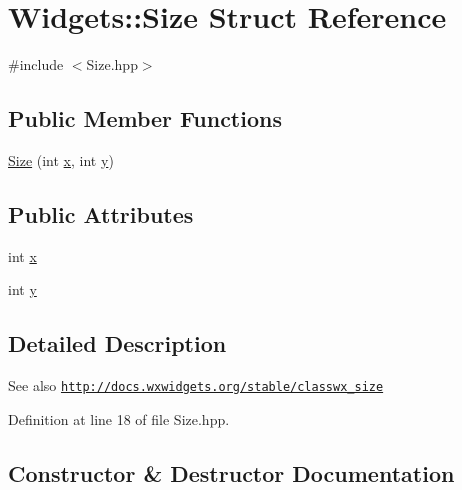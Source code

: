 \hypertarget{struct_widgets_1_1_size}{}\section{Widgets\+:\+:Size Struct Reference}
\label{struct_widgets_1_1_size}


{\ttfamily \#include $<$Size.\+hpp$>$}

\subsection*{Public Member Functions}
\begin{DoxyCompactItemize}
\item 
\hyperlink{struct_widgets_1_1_size_adbe84b848a3f80680f7b6e716691b83a}{Size} (int \hyperlink{struct_widgets_1_1_size_a49c5bc810ac1bc55c4466f94ca56fec0}{x}, int \hyperlink{struct_widgets_1_1_size_adf38e2f9f1cdf5b919a03004fe02c59d}{y})
\end{DoxyCompactItemize}
\subsection*{Public Attributes}
\begin{DoxyCompactItemize}
\item 
int \hyperlink{struct_widgets_1_1_size_a49c5bc810ac1bc55c4466f94ca56fec0}{x}
\item 
int \hyperlink{struct_widgets_1_1_size_adf38e2f9f1cdf5b919a03004fe02c59d}{y}
\end{DoxyCompactItemize}


\subsection{Detailed Description}
\begin{DoxySeeAlso}{See also}
\href{http://docs.wxwidgets.org/stable/classwx_size}{\tt http\+://docs.\+wxwidgets.\+org/stable/classwx\+\_\+size} 
\end{DoxySeeAlso}


Definition at line 18 of file Size.\+hpp.



\subsection{Constructor \& Destructor Documentation}
